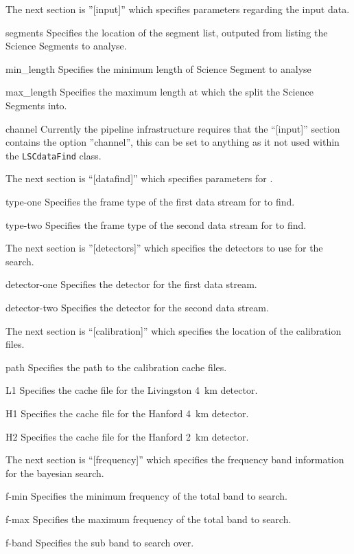 \begin{entry}
The next section is ''[input]'' which specifies parameters regarding
the input data.
\begin{entry}
\item[segments]
Specifies the location of the segment list, outputed from
 listing the Science Segments to analyse.
\item[min\_length]
Specifies the minimum length of Science Segment to analyse
\item[max\_length]
Specifies the maximum length at which the split the Science Segments
into.
\item[channel]
Currently the pipeline infrastructure requires that the ``[input]''
section contains the option ''channel'', this can be set to anything as
it not used within the \texttt{LSCdataFind} class.
\end{entry}

The next section is ``[datafind]'' which specifies parameters for
.
\begin{entry}
\item[type-one]
Specifies the frame type of the first data stream for 
to find.
\item[type-two]
Specifies the frame type of the second data stream for
 to find.
\end{entry}

The next section is ''[detectors]'' which specifies the detectors to use
for the search.
\begin{entry}
\item[detector-one]
Specifies the detector for the first data stream.
\item[detector-two]
Specifies the detector for the second data stream.
\end{entry}

The next section is ``[calibration]'' which specifies the location of
the calibration files.
\begin{entry}
\item[path]
Specifies the path to the calibration cache files.
\item[L1]
Specifies the cache file for the Livingston 4~km detector.
\item[H1]
Specifies the cache file for the Hanford 4~km detector.
\item[H2]
Specifies the cache file for the Hanford 2~km detector.
\end{entry}

The next section is ``[frequency]'' which specifies the frequency band
information for the bayesian search.
\begin{entry}
\item[f-min]
Specifies the minimum frequency of the total band to search.
\item[f-max]
Specifies the maximum frequency of the total band to search.
\item[f-band]
Specifies the sub band to search over.
\end{entry}


\end{entry}
